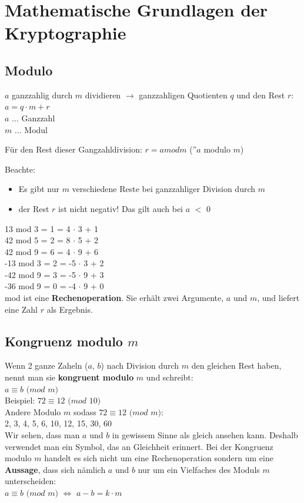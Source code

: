\chapter{Mathematische Grundlagen der Kryptographie}
\section{Modulo}
$a$ ganzzahlig durch $m$ dividieren $\rightarrow$ ganzzahligen Quotienten $q$ und den Rest $r$: \\
$a = q \cdot m + r$ \\
$a$ ... Ganzzahl \\
$m$ ... Modul

Für den Rest dieser Gangzahldivision:
$r = a mod m$ (''$a$ modulo $m$)

Beachte:
\begin{itemize}
	\item Es gibt nur $m$ verschiedene Reste bei ganzzahliger Division durch $m$
	\item der Rest $r$ ist nicht negativ! Das gilt auch bei $a$ $<$ 0
\end{itemize}

13 mod 3 = 1  = 4 $\cdot$ 3 + 1\\
42 mod 5 = 2  = 8 $\cdot$ 5 + 2\\
42 mod 9 = 6  = 4 $\cdot$ 9 + 6\\
-13 mod 3 = 2  = -5 $\cdot$ 3 + 2\\
-42 mod 9 = 3  = -5 $\cdot$ 9 + 3\\
-36 mod 9 = 0  = -4 $\cdot$ 9 + 0 \\

mod ist eine \textbf{Rechenoperation}. Sie erhält zwei Argumente, $a$ und $m$, und liefert eine Zahl $r$ als Ergebnis.

\section{Kongruenz modulo $m$}
Wenn 2 ganze Zaheln ($a$, $b$) nach Division durch $m$ den gleichen Rest haben, nennt man sie \textbf{kongruent modulo} $m$ und schreibt:\\
$a \equiv b$ $(mod$ $m)$ \\
Beispiel: $72 \equiv 12$ $(mod$ $10)$ \\
Andere Modulo $m$ sodass $72 \equiv 12$ $(mod$ $m)$: \\
2, 3, 4, 5, 6, 10, 12, 15, 30, 60 \\
Wir sehen, dass man $a$ und $b$ in gewissem Sinne als gleich ansehen kann. Deshalb verwendet man ein Symbol, das an Gleichheit erinnert. Bei der Kongruenz modulo $m$ handelt es sich nicht um eine Rechenoperation sondern um eine \textbf{Aussage}, dass sich nämlich $a$ und $b$ nur um ein Vielfaches des Moduls $m$ unterscheiden: \\
$a \equiv b$ $(mod$ $m)$ $\Leftrightarrow$ $a - b = k \cdot m$

